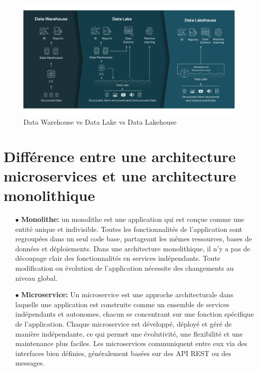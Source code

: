 \begin{figure}[H]
\centering
\includegraphics[width=\linewidth]{images/data-warehouse-data-lake-datalakehouse.png}
\caption{Data Warehouse vs Data Lake vs Data Lakehouse}\label{fig:data-warehouse-data-lake-datalakehouse}
\end{figure}

\section{Différence entre une architecture microservices et une architecture monolithique}
\begin{enumerate}
    \item[$\bullet$] \textbf{Monolithe:} un monolithe est une application qui est conçue comme une entité unique et indivisible. Toutes les fonctionnalités de l'application sont regroupées dans un seul code base, partageant les mêmes ressources, bases de données et déploiements. Dans une architecture monolithique, il n'y a pas de découpage clair des fonctionnalités en services indépendants. Toute modification ou évolution de l'application nécessite des changements au niveau global.
    \item[$\bullet$] \textbf{Microservice:} Un microservice est une approche architecturale dans laquelle une application est construite comme un ensemble de services indépendants et autonomes, chacun se concentrant sur une fonction spécifique de l'application. Chaque microservice est développé, déployé et géré de manière indépendante, ce qui permet une évolutivité, une flexibilité et une maintenance plus faciles. Les microservices communiquent entre eux via des interfaces bien définies, généralement basées sur des API REST ou des messages.
\end{enumerate}

